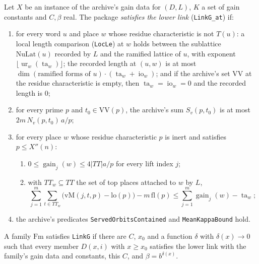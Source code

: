 \begin{definition}\label{geob:lowerlink}
Let $X$ be an instance of the archive's gain data for $(D,L)$, $K$ a set of
gain constants and $C,\beta$ real. The package \emph{satisfies the lower link}
(\texttt{LinkG\_at}) if:
\begin{enumerate}
\item for every word $u$ and place $w$ whose residue characteristic is not
$T(u)$: a local length comparison (\texttt{LocLe}) at $w$ holds between the sublattice $\mathrm{NuLat}(u)$ recorded by $L$ and
the ramified lattice of $u$, with exponent
$\lfloor\operatorname{ur}_w(\operatorname{ta}_w)\rfloor$; the recorded length
at $(u,w)$ is at most $\dim(\text{ramified forms of }u)\cdot(\operatorname{ta}_w+\operatorname{io}_w)$;
and if the archive's set $\mathrm{VV}$ at the residue characteristic is empty,
then $\operatorname{ta}_w=\operatorname{io}_w=0$ and the recorded length is $0$;
\item for every prime $p$ and $t_0\in\mathrm{VV}(p)$, the archive's sum
$S_v(p,t_0)$ is at most $2m\,N_v(p,t_0)\,a/p$;
\item for every place $w$ whose residue characteristic $p$ is inert and
satisfies $p\le X''(n)$:
\begin{enumerate}
\item $0\le\operatorname{gain}_j(w)\le 4|TT|a/p$ for every lift index $j$;
\item with $TT_w\subseteq TT$ the set of top places attached to $w$ by $L$,
\[
\sum_{j=1}^m\sum_{t\in TT_w}\bigl(\mathrm{vM}(j,t,p)-\mathrm{lo}(p)\bigr)-m\,\mathrm{fl}(p)
\le\sum_{j=1}^m\operatorname{gain}_j(w)-\operatorname{ta}_w;
\]
\end{enumerate}
\item the archive's predicates \texttt{ServedOrbitsContained} and
\texttt{MeanKappaBound} hold.
\end{enumerate}
A family $\mathrm{Fm}$ satisfies \texttt{LinkG} if there are $C$, $x_0$ and a
function $\delta$ with $\delta(x)\to0$ such that every member $D(x,i)$ with
$x\ge x_0$ satisfies the lower link with the family's gain data and constants,
this $C$, and $\beta=b^{\delta(x)}$.
\end{definition}


